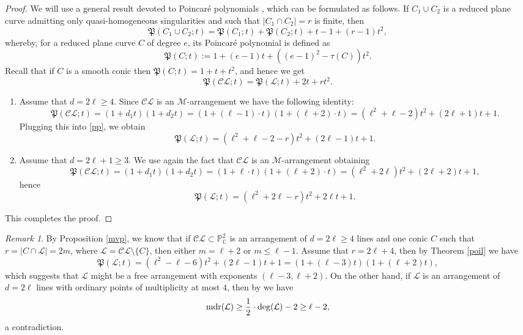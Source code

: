 \documentclass[11pt]{article}
\theoremstyle{plain}
\theoremstyle{definition}
\theoremstyle{remark}
\newtheorem{remark}[theorem]{Remark}
\begin{document}
\begin{proof}
We will use a general result devoted to Poincar\'e polynomials \cite[Theorem 1.2]{Pok1}, which can be formulated as follows. If $C_{1}\cup C_{2}$ is a reduced plane curve admitting only quasi-homogeneous singularities and such that $|C_{1} \cap C_{2}| = r$ is finite, then
$$\mathfrak{P}(C_{1} \cup C_{2};t) = \mathfrak{P}(C_{1};t) + \mathfrak{P}(C_{2};t) + t-1 + (r-1)t^{2},$$
whereby, for a reduced plane curve $C$ of degree $e$, its Poincar\'e polynomial is defined as
$$\mathfrak{P}(C;t) := 1+(e-1)t + ((e-1)^{2} - \tau(C))t^{2}.$$
Recall that if $C$ is a smooth conic then $\mathfrak{P}(C;t) = 1+t+t^{2}$, and hence we get
\begin{equation}
\label{pp}
\mathfrak{P}(\mathcal{CL};t) = \mathfrak{P}(\mathcal{L};t) + 2t + rt^{2}.
\end{equation}
\begin{enumerate}
\item Assume that $d = 2\ell \geq 4$. Since $\mathcal{CL}$ is an $\mathscr{M}$-arrangement we have the following identity:
$$\mathfrak{P}(\mathcal{CL};t) = (1+d_{1}t)(1+d_{2}t) = (1+(\ell-1)\cdot t)(1+(\ell+2)\cdot t) = (\ell^{2}+\ell-2)t^{2}+(2\ell+1)t+1.$$
Plugging this into \eqref{pp}, we obtain
$$\mathfrak{P}(\mathcal{L};t) = (\ell^{2}+\ell-2-r)t^{2}+(2\ell-1)t+1.$$
\item Assume that $d = 2\ell +1 \geq 3$. We use again the fact that $\mathcal{CL}$ is an $\mathscr{M}$-arrangement obtaining
$$\mathfrak{P}(\mathcal{CL};t) = (1+d_{1}t)(1+d_{2}t) = (1+\ell\cdot t)(1+(\ell+2)\cdot t) = (\ell^2 + 2\ell)t^{2} + (2\ell+2)t+1,$$
hence
$$\mathfrak{P}(\mathcal{L};t) = (\ell^{2}+2\ell-r)t^{2}+2\ell t+1.$$
\end{enumerate}
This completes the proof.
\end{proof}
\begin{remark}
By Proposition \ref{mvp}, we know that if $\mathcal{CL}\subset \mathbb{P}^{2}_{\mathbb{C}}$ is an arrangement of $d=2\ell\geq 4$ lines and one conic $C$ such that $r = |C \cap \mathcal{L}| = 2m$, where $\mathcal{L} = \mathcal{CL}\setminus \{C\}$, then either $m=\ell+2$ or $m\leq \ell-1$. Assume that $r=2\ell+4$, then by Theorem \ref{poil} we have
$$\mathfrak{P}(\mathcal{L};t) = (\ell^{2}-\ell-6)t^{2}+(2\ell-1)t+1 = (1+(\ell-3)t)(1+(\ell+2)t),$$
which suggests that $\mathcal{L}$ might be a free arrangement with exponents $(\ell-3, \ell+2)$. On the other hand, if $\mathcal{L}$ is an arrangement of $d=2\ell$ lines with ordinary points of multiplicity at most $4$, then by \cite[Theorem 2.1]{Dimca2} we have
$${\rm mdr}(\mathcal{L}) \geq \frac{1}{2} \cdot {\rm deg}(\mathcal{L}) - 2 \geq \ell - 2,$$
a contradiction.
\end{remark}
\end{document}
